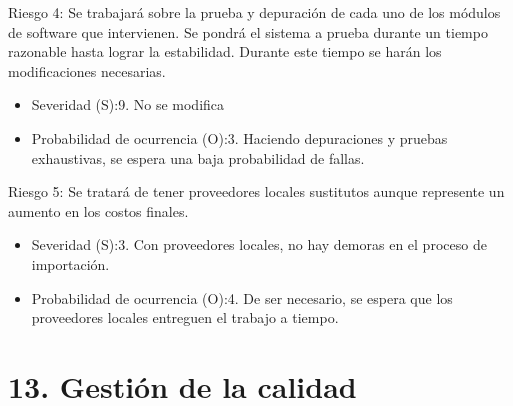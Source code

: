 \documentclass[11pt]{charter}
\begin{document}
Riesgo 4: Se trabajará sobre la prueba y depuración de cada uno de los módulos de software que intervienen. Se pondrá el sistema a prueba durante un tiempo razonable hasta lograr la estabilidad. Durante este tiempo se harán los modificaciones necesarias.
\begin{itemize}
\item Severidad (S):9. No se modifica
\item Probabilidad de ocurrencia (O):3. Haciendo depuraciones y pruebas exhaustivas, se espera una baja probabilidad de fallas.
\end{itemize}

Riesgo 5:  Se tratará de tener  proveedores locales sustitutos aunque represente un aumento en los costos finales. 
\begin{itemize}
\item Severidad (S):3. Con proveedores locales, no hay demoras en el proceso de importación.
\item Probabilidad de ocurrencia (O):4. De ser necesario, se espera que los proveedores locales entreguen el trabajo a tiempo.
\end{itemize}



\section{13. Gestión de la calidad}
\label{sec:calidad}
\end{document}
